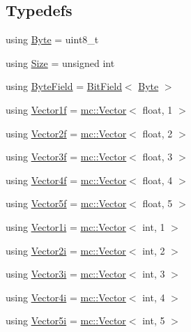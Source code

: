 \subsection*{Typedefs}
\begin{DoxyCompactItemize}
\item 
using \hyperlink{namespacemc_a64bc4fa1f43bc4da5c7ac98c04c863e8}{Byte} = uint8\+\_\+t
\item 
using \hyperlink{namespacemc_ad1c06461067735b3b17e0df612532c4e}{Size} = unsigned int
\item 
using \hyperlink{namespacemc_a4ed352b00f84d2c3e9843cf5ea375ca0}{Byte\+Field} = \hyperlink{structmc_1_1_bit_field}{Bit\+Field}$<$ \hyperlink{namespacemc_a64bc4fa1f43bc4da5c7ac98c04c863e8}{Byte} $>$
\item 
using \hyperlink{namespacemc_a189909477b1267500c9b30cf606df884}{Vector1f} = \hyperlink{classmc_1_1_vector}{mc\+::\+Vector}$<$ float, 1 $>$
\item 
using \hyperlink{namespacemc_a58c645c7ce4d8e1b71ae618f37f8a162}{Vector2f} = \hyperlink{classmc_1_1_vector}{mc\+::\+Vector}$<$ float, 2 $>$
\item 
using \hyperlink{namespacemc_ae4429bda568885c31776f449138faba0}{Vector3f} = \hyperlink{classmc_1_1_vector}{mc\+::\+Vector}$<$ float, 3 $>$
\item 
using \hyperlink{namespacemc_a4707e2534bbb331543497a85a755bc1c}{Vector4f} = \hyperlink{classmc_1_1_vector}{mc\+::\+Vector}$<$ float, 4 $>$
\item 
using \hyperlink{namespacemc_adf31bc87669908e0eb5e5c10506f4d85}{Vector5f} = \hyperlink{classmc_1_1_vector}{mc\+::\+Vector}$<$ float, 5 $>$
\item 
using \hyperlink{namespacemc_a6be7455b4341d989d713cfd9387b47ed}{Vector1i} = \hyperlink{classmc_1_1_vector}{mc\+::\+Vector}$<$ int, 1 $>$
\item 
using \hyperlink{namespacemc_a9d370d4e850e128d4c7ca446fd785a0d}{Vector2i} = \hyperlink{classmc_1_1_vector}{mc\+::\+Vector}$<$ int, 2 $>$
\item 
using \hyperlink{namespacemc_a4d62b05faba771617b95b5b75b6f15c3}{Vector3i} = \hyperlink{classmc_1_1_vector}{mc\+::\+Vector}$<$ int, 3 $>$
\item 
using \hyperlink{namespacemc_a2886018be91992764bd5cf4e57f56cd8}{Vector4i} = \hyperlink{classmc_1_1_vector}{mc\+::\+Vector}$<$ int, 4 $>$
\item 
using \hyperlink{namespacemc_a7ed5c5e05ed6579a2bd14ad0e00fc8d8}{Vector5i} = \hyperlink{classmc_1_1_vector}{mc\+::\+Vector}$<$ int, 5 $>$

\end{DoxyCompactItemize}
